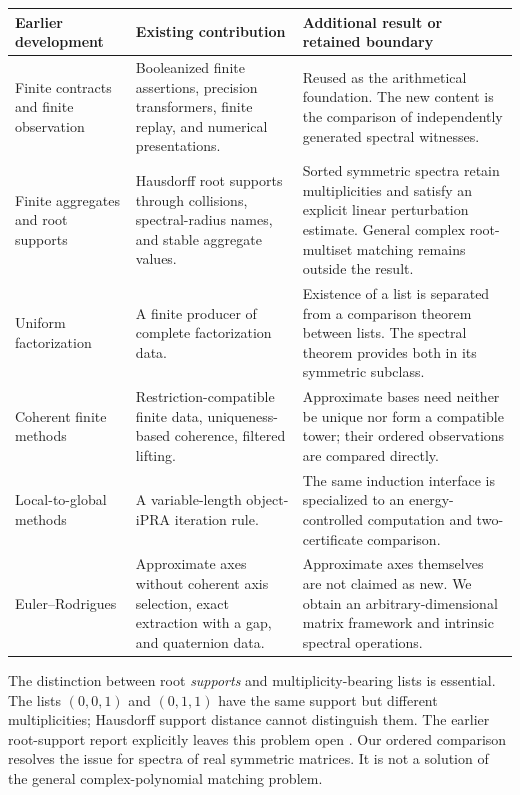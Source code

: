 \begin{longtable}{@{}P{0.23\textwidth}P{0.34\textwidth}P{0.37\textwidth}@{}}
\toprule
Earlier development & Existing contribution & Additional result or retained boundary \\
\midrule\endhead
Finite contracts and finite observation \cite{contracts,observations} & Booleanized finite assertions, precision transformers, finite replay, and numerical presentations. & Reused as the arithmetical foundation. The new content is the comparison of independently generated spectral witnesses. \\
Finite aggregates and root supports \cite{aggregates,rootsupport} & Hausdorff root supports through collisions, spectral-radius names, and stable aggregate values. & Sorted symmetric spectra retain multiplicities and satisfy an explicit linear perturbation estimate. General complex root-multiset matching remains outside the result. \\
Uniform factorization \cite{factorization} & A finite producer of complete factorization data. & Existence of a list is separated from a comparison theorem between lists. The spectral theorem provides both in its symmetric subclass. \\
Coherent finite methods \cite{coherent} & Restriction-compatible finite data, uniqueness-based coherence, filtered lifting. & Approximate bases need neither be unique nor form a compatible tower; their ordered observations are compared directly. \\
Local-to-global methods \cite{localglobal} & A variable-length object-iPRA iteration rule. & The same induction interface is specialized to an energy-controlled computation and two-certificate comparison. \\
Euler--Rodrigues \cite{rotations} & Approximate axes without coherent axis selection, exact extraction with a gap, and quaternion data. & Approximate axes themselves are not claimed as new. We obtain an arbitrary-dimensional matrix framework and intrinsic spectral operations. \\
\bottomrule
\end{longtable}

The distinction between root \emph{supports} and multiplicity-bearing lists is essential. The lists $(0,0,1)$ and $(0,1,1)$ have the same support but different multiplicities; Hausdorff support distance cannot distinguish them. The earlier root-support report explicitly leaves this problem open \cite{rootsupport}. Our ordered comparison resolves the issue for spectra of real symmetric matrices. It is not a solution of the general complex-polynomial matching problem.

